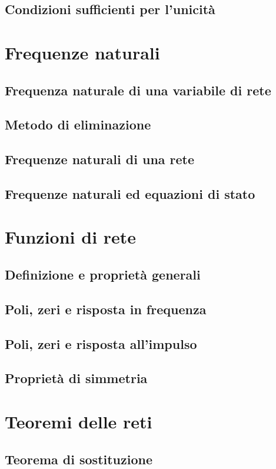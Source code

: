 \documentclass[a4paper,12pt]{article}
\theoremstyle{mystyle}
\begin{document}
\subsection{Condizioni sufficienti per l'unicità}

\section{Frequenze naturali}
\subsection{Frequenza naturale di una variabile di rete}
\subsection{Metodo di eliminazione}
\subsection{Frequenze naturali di una rete}
\subsection{Frequenze naturali ed equazioni di stato}

\section{Funzioni di rete}
\subsection{Definizione e proprietà generali}
\subsection{Poli, zeri e risposta in frequenza}
\subsection{Poli, zeri e risposta all'impulso}
\subsection{Proprietà di simmetria}

\section{Teoremi delle reti}
\subsection{Teorema di sostituzione}
\end{document}
